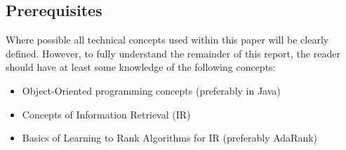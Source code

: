 \subsection{Prerequisites}
Where possible all technical concepts used within this paper will be clearly defined. However, to fully understand the remainder of this report, 
the reader should have at least some knowledge of the following concepts:
\begin{itemize}
 \item Object-Oriented programming concepts (preferably in Java)
 \item Concepts of Information Retrieval (IR)
 \item Basics of Learning to Rank Algorithms for IR (preferably AdaRank)
\end{itemize}




